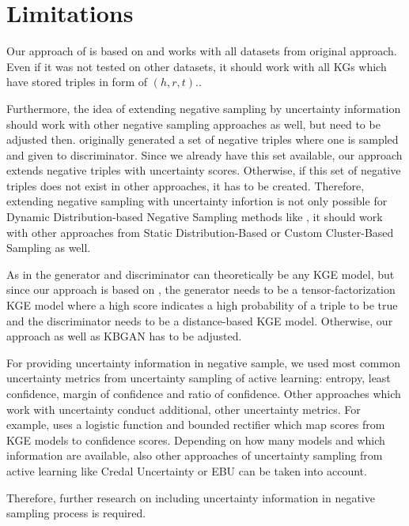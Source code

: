 \section{Limitations}  
\label{sec:limitations}

Our approach of \usgan is based on \kbgan and works with all datasets from original approach.
Even if it was not tested on other datasets, it should work with all \acp{KG} which have stored triples in form of $(h,r,t)$..

Furthermore, the idea of extending negative sampling by uncertainty information should work with other negative sampling approaches as well, but need to be adjusted then.
\kbgan originally generated a set of negative triples where one is sampled and given to discriminator.
Since we already have this set available, our approach extends negative triples with uncertainty scores.
Otherwise, if this set of negative triples does not exist in other approaches, it has to be created.
Therefore, extending negative sampling with uncertainty infortion is not only possible for Dynamic Distribution-based Negative Sampling methods like \kbgan, it should work with other approaches from Static Distribution-Based or Custom Cluster-Based Sampling as well.

As in \kbgan the generator and discriminator can theoretically be any \ac{KGE} model, but since our approach is based on \kbgan, the generator needs to be a tensor-factorization \ac{KGE} model where a high score indicates a high probability of a triple to be true and the discriminator needs to be a distance-based \ac{KGE} model.
Otherwise, our approach as well as \textsc{KBGAN} has to be adjusted.

For providing uncertainty information in negative sample, we used most common uncertainty metrics from uncertainty sampling of active learning:
entropy, least confidence, margin of confidence and ratio of confidence.
Other approaches which work with uncertainty conduct additional, other uncertainty metrics.
For example, \cite{UKGE} uses a logistic function and bounded rectifier which map scores from \ac{KGE} models to confidence scores.
Depending on how many models and which information are available, also other approaches of uncertainty sampling from active learning like Credal Uncertainty or \ac{EBU} can be taken into account.

Therefore, further research on including uncertainty information in negative sampling process is required.






